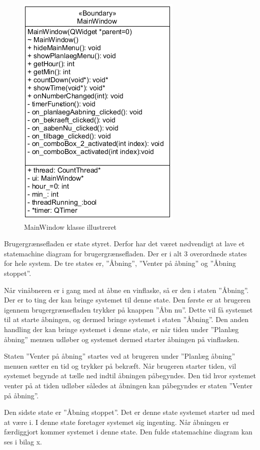 \begin{figure}[H]
	\centerline{\includegraphics[scale=1]{tex/Design/GUI/Fotos/MainWindow}}
	\caption{MainWindow klasse illustreret}
\end{figure}

Brugergrænsefladen er state styret. Derfor har det været nødvendigt at lave et statemachine diagram for brugergrænsefladen. Der er i alt 3 overordnede states for hele system. De tre states er, ”Åbning”, ”Venter på åbning” og ”Åbning stoppet”.

Når vinåbneren er i gang med at åbne en vinflaske, så er den i staten ”Åbning”. Der er to ting der kan bringe systemet til denne state. Den første er at brugeren igennem brugergrænsefladen trykker på knappen ”Åbn nu”. Dette vil få systemet til at starte åbningen, og dermed bringe systemet i staten ”Åbning”. Den anden handling der kan bringe systemet i denne state, er når tiden under ”Planlæg åbning” menuen udløber og systemet dermed starter åbningen på vinflasken. 

Staten ”Venter på åbning” startes ved at brugeren under ”Planlæg åbning” menuen sætter en tid og trykker på bekræft. Når brugeren starter tiden, vil systemet begynde at tælle ned indtil åbningen påbegyndes. Den tid hvor systemet venter på at tiden udløber således at åbningen kan påbegyndes er staten ”Venter på åbning”.

Den sidste state er ”Åbning stoppet”. Det er denne state systemet starter ud med at være i. I denne state foretager systemet sig ingenting. Når åbningen er færdiggjort kommer systemet i denne state. Den fulde statemachine diagram kan ses i bilag x.